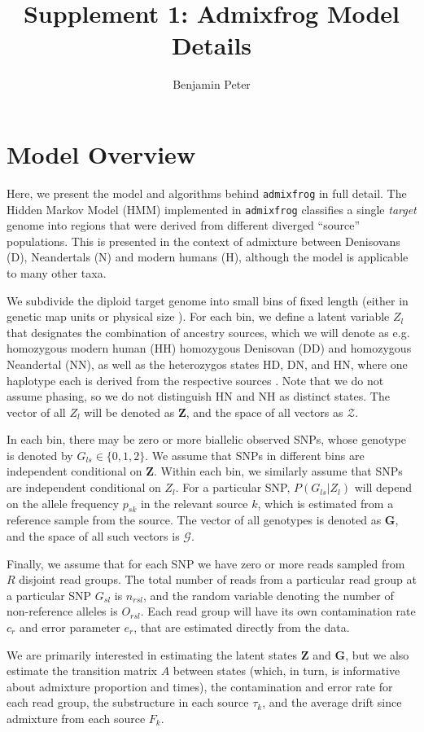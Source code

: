 \documentclass[10pt,a4paper]{article}
\author{Benjamin Peter}
\title{Supplement 1: Admixfrog Model Details}
\newcommand{\BFZ}{\mathbf{Z}}
\newcommand{\BFG}{\mathbf{G}}
\begin{document}
	\maketitle
\section*{Model Overview}
	Here, we present the model and algorithms behind \texttt{admixfrog} in full detail. The Hidden Markov Model (HMM) implemented in \texttt{admixfrog} classifies a single \emph{target} genome into regions that were derived from different diverged ``source'' populations. This is presented in the context of admixture between Denisovans (D), Neandertals (N) and modern humans (H), although the model is applicable to many other taxa. 
	
	We subdivide the diploid target genome into small bins of fixed length (either in genetic map units or physical size ). For each bin, we define a latent variable $Z_l$ that designates the combination of ancestry sources, which we will denote as e.g. homozygous modern human (HH) homozygous Denisovan (DD) and homozygous Neandertal (NN), as well as the heterozygos states HD, DN, and HN, where one haplotype each is derived from the respective sources . Note that we do not assume phasing, so we do not distinguish HN and NH as distinct states. The vector of all $Z_l$ will be denoted as $\BFZ$, and the space of all vectors as $\mathcal{Z}$.
	
	In each bin, there may be zero or more biallelic observed SNPs, whose genotype is denoted by $G_{ls} \in \{0, 1, 2\}$. We assume that SNPs in different bins are independent conditional on $\BFZ$. Within each bin, we similarly assume that SNPs are independent conditional on $Z_l$. For a particular SNP, $P(G_{ls} | Z_l)$ will depend on the allele frequency $p_{sk}$ in the relevant source $k$, which is estimated from a reference sample from the source. The vector of all genotypes is denoted as $\BFG$, and the space of all such vectors is $\mathcal{G}$.
	
	Finally, we assume that for each SNP we have zero or more reads sampled from $R$ disjoint read groups. The total number of reads from a particular read group at a particular SNP $G_{sl}$ is $n_{rsl}$, and the random variable denoting the number of non-reference alleles is $O_{rsl}$. Each read group will have its own contamination rate $c_r$ and error parameter $e_r$, that are estimated directly from the data.
	
	We are primarily interested in estimating the latent states $\BFZ$ and $\BFG$, but we also estimate the transition matrix $A$ between states (which, in turn, is informative about admixture proportion and times), the contamination and error rate for each read group, the substructure in each source $\tau_k$, and the average drift since admixture from each source $F_k$. 
\end{document}
